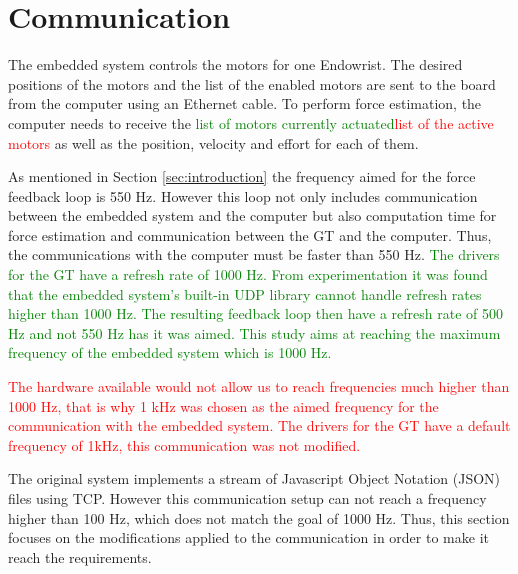 \section{Communication}
The embedded system controls the motors for one Endowrist. The desired positions of the motors and the list of the enabled motors are sent to the board from the computer using an Ethernet cable. To perform force estimation, the computer needs to receive the \textcolor{green}{list of motors currently actuated}\textcolor{red}{list of the active motors} as well as the position, velocity and effort for each of them.

As mentioned in Section \ref{sec:introduction} the frequency aimed for the force feedback loop is 550 Hz. However this loop not only includes communication between the embedded system and the computer but also computation time for force estimation and communication between the GT and the computer. Thus, the communications with the computer must be faster than 550 Hz.
\textcolor{green}{The drivers for the GT have a refresh rate of 1000 Hz. From experimentation it was found that the embedded system's built-in UDP library cannot handle refresh rates higher than 1000 Hz. The resulting feedback loop then have a refresh rate of 500 Hz and not 550 Hz has it was aimed. This study aims at reaching the maximum frequency of the embedded system which is 1000 Hz.}

\textcolor{red}{The hardware available would not allow us to reach frequencies much higher than 1000 Hz, that is why 1 kHz was chosen as the aimed frequency for the communication with the embedded system. The drivers for the GT have a default frequency of 1kHz, this communication was not modified.}


The original system implements a stream of Javascript Object Notation (JSON)\cite{JSON_IETF} files using TCP. However this communication setup can not reach a frequency higher than 100 Hz, which does not match the goal of 1000 Hz. Thus, this section focuses on the modifications applied to the communication in order to make it reach the requirements.
 
